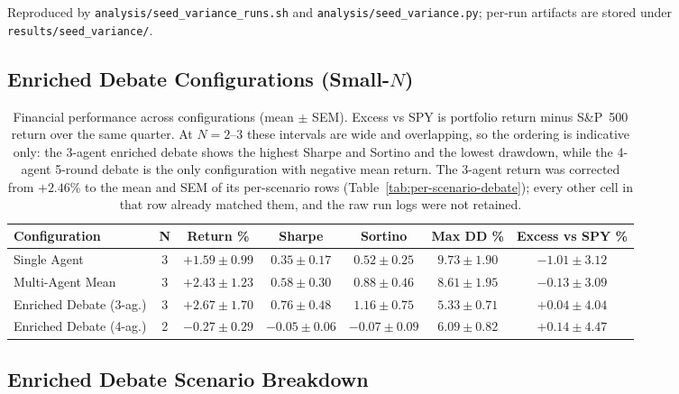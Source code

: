 \documentclass{article}
\begin{document}
Reproduced by \texttt{analysis/seed\_variance\_runs.sh} and
\texttt{analysis/seed\_variance.py}; per-run artifacts are stored under
\texttt{results/seed\_variance/}.


\subsection{Enriched Debate Configurations (Small-$N$)}
\label{app:enriched-smalln}

\begin{table}[H]
\centering
\small
\begin{tabular}{@{}lcccccc@{}}
\toprule
\textbf{Configuration} & \textbf{N} & \textbf{Return \%} & \textbf{Sharpe} & \textbf{Sortino} & \textbf{Max DD \%} & \textbf{Excess vs SPY \%} \\
\midrule
Single Agent            & 3 & $+1.59 \pm 0.99$ & $0.35 \pm 0.17$ & $0.52 \pm 0.25$ & $9.73 \pm 1.90$ & $-1.01 \pm 3.12$ \\
Multi-Agent Mean        & 3 & $+2.43 \pm 1.23$ & $0.58 \pm 0.30$ & $0.88 \pm 0.46$ & $8.61 \pm 1.95$ & $-0.13 \pm 3.09$ \\
Enriched Debate (3-ag.) & 3 & $+2.67 \pm 1.70$ & $0.76 \pm 0.48$ & $1.16 \pm 0.75$ & $5.33 \pm 0.71$ & $+0.04 \pm 4.04$ \\
Enriched Debate (4-ag.) & 2 & $-0.27 \pm 0.29$ & $-0.05 \pm 0.06$ & $-0.07 \pm 0.09$ & $6.09 \pm 0.82$ & $+0.14 \pm 4.47$ \\
\bottomrule
\end{tabular}
\vspace{4pt}
\setlength{\belowcaptionskip}{-4pt}
\caption{Financial performance across configurations (mean $\pm$ SEM). Excess vs SPY is portfolio return minus S\&P~500 return over the same quarter. At $N{=}2$--$3$ these intervals are wide and overlapping, so the ordering is indicative only: the 3-agent enriched debate shows the highest Sharpe and Sortino and the lowest drawdown, while the 4-agent 5-round debate is the only configuration with negative mean return. The 3-agent return was corrected from $+2.46\%$ to the mean and SEM of its per-scenario rows (Table~\ref{tab:per-scenario-debate}); every other cell in that row already matched them, and the raw run logs were not retained.}
\label{tab:financial-results_across}
\end{table}

\subsection{Enriched Debate Scenario Breakdown}
\label{app:per-scenario-debate}
\end{document}
